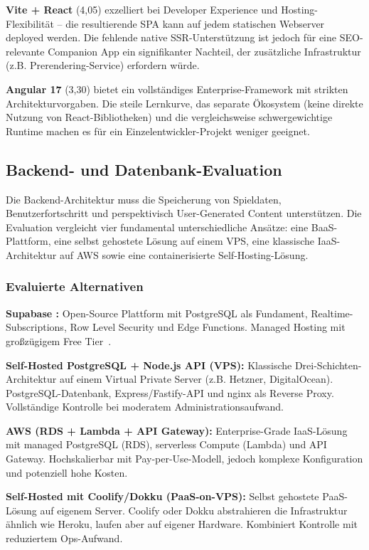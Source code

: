 \textbf{Vite + React} (4,05) exzelliert bei Developer Experience und Hosting-Flexibilität – die resultierende SPA kann auf jedem statischen Webserver deployed werden. Die fehlende native SSR-Unterstützung ist jedoch für eine SEO-relevante Companion App ein signifikanter Nachteil, der zusätzliche Infrastruktur (z.B. Prerendering-Service) erfordern würde.

\textbf{Angular 17} (3,30) bietet ein vollständiges Enterprise-Framework mit strikten Architekturvorgaben. Die steile Lernkurve, das separate Ökosystem (keine direkte Nutzung von React-Bibliotheken) und die vergleichsweise schwergewichtige Runtime machen es für ein Einzelentwickler-Projekt weniger geeignet.

\subsection{Backend- und Datenbank-Evaluation}
\label{sec:backend-evaluation}

Die Backend-Architektur muss die Speicherung von Spieldaten, Benutzerfortschritt und perspektivisch User-Generated Content unterstützen. Die Evaluation vergleicht vier fundamental unterschiedliche Ansätze: eine \ac{BaaS}-Plattform, eine selbst gehostete Lösung auf einem \ac{VPS}, eine klassische \ac{IaaS}-Architektur auf AWS sowie eine containerisierte Self-Hosting-Lösung.

\subsubsection{Evaluierte Alternativen}

\textbf{Supabase :} Open-Source Plattform mit PostgreSQL als Fundament, Realtime-Subscriptions, Row Level Security und Edge Functions. Managed Hosting mit großzügigem Free Tier~\cite{supabase2024}.

\textbf{Self-Hosted PostgreSQL + Node.js API (VPS):} Klassische Drei-Schichten-Architektur auf einem Virtual Private Server (z.B. Hetzner, DigitalOcean). PostgreSQL-Datenbank, Express/Fastify-API und nginx als Reverse Proxy. Vollständige Kontrolle bei moderatem Administrationsaufwand.

\textbf{AWS (RDS + Lambda + API Gateway):} Enterprise-Grade \ac{IaaS}-Lösung mit managed PostgreSQL (RDS), serverless Compute (Lambda) und API Gateway. Hochskalierbar mit Pay-per-Use-Modell, jedoch komplexe Konfiguration und potenziell hohe Kosten.

\textbf{Self-Hosted mit Coolify/Dokku (PaaS-on-VPS):} Selbst gehostete \ac{PaaS}-Lösung auf eigenem Server. Coolify oder Dokku abstrahieren die Infrastruktur ähnlich wie Heroku, laufen aber auf eigener Hardware. Kombiniert Kontrolle mit reduziertem Ops-Aufwand.

